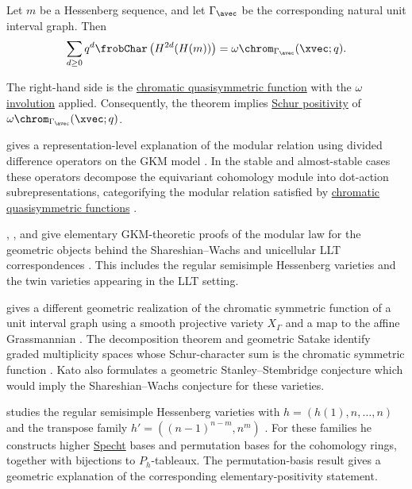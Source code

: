 \begin{theorem}
Let $m$ be a Hessenberg sequence, and let $\Gamma_\avec$ be the corresponding
natural unit interval graph.  Then
\[
\sum_{d\geq 0}
q^d
\frobChar\left(H^{2d}(H(m))\right)
=
\omega \chrom_{\Gamma_\avec}(\xvec;q).
\]
\end{theorem}

The right-hand side is the \hyperref[chromaticQuasisymmetric]{chromatic
quasisymmetric function} with the
\hyperref[standardInvolution]{$\omega$ involution} applied.  Consequently,
the theorem implies \hyperref[schurPositivity]{Schur positivity} of
$\omega\chrom_{\Gamma_\avec}(\xvec;q)$.

 gives a representation-level explanation of the
modular relation using divided difference operators on the GKM model
\cite{GuayPaquet2025x}.  In the stable and almost-stable cases these
operators decompose the equivariant cohomology module into dot-action
subrepresentations, categorifying the modular relation satisfied by
\hyperref[chromaticQuasisymmetric]{chromatic quasisymmetric functions}
\cite[Thm.~5.1 and
Thm.~5.3]{GuayPaquet2025x}.

, , and 
give elementary GKM-theoretic proofs of the modular law for the geometric
objects behind the Shareshian--Wachs and unicellular LLT correspondences
\cite{HoriguchiMasudaSato2023x}.  This includes the regular semisimple
Hessenberg varieties and the twin varieties appearing in the LLT setting.

 gives a different geometric realization of the chromatic
symmetric function of a unit interval graph using a smooth projective variety
$X_\Gamma$ and a map to the affine Grassmannian
\cite{Kato2024x}.  The decomposition theorem and geometric Satake identify
graded multiplicity spaces whose Schur-character sum is the chromatic
symmetric function \cite[Thm.~A]{Kato2024x}.  Kato also formulates a
geometric Stanley--Stembridge conjecture which would imply the
Shareshian--Wachs conjecture for these varieties.

 studies the regular semisimple Hessenberg varieties with
$h=(h(1),n,\dotsc,n)$ and the transpose family
$h'=((n-1)^{n-m},n^m)$ \cite{Salois2026}.  For these families he constructs
higher \hyperref[spechtModules]{Specht} bases and permutation bases for the
cohomology rings, together with bijections to $P_h$-tableaux.  The
permutation-basis result gives a
geometric explanation of the corresponding elementary-positivity statement.


